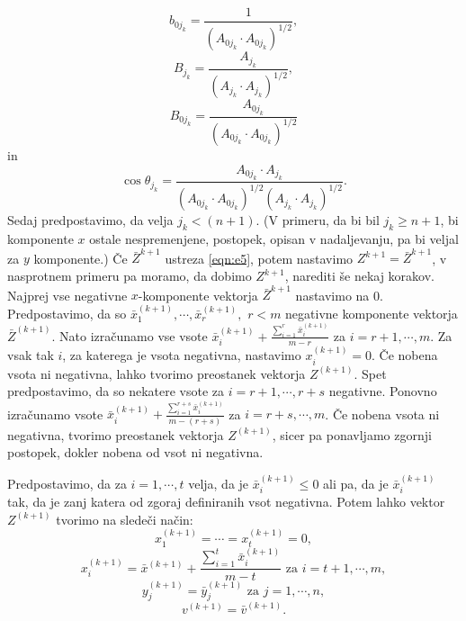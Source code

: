 \documentclass[a4paper,12pt]{article}
\begin{document}
\begin{equation*}
    b_{0j_k} = \frac{1}{(A_{0j_k}\cdot A_{0j_k})^{1/2}},
\end{equation*}
\begin{equation*}
B_{j_k} = \frac{A_{j_k}}{(A_{j_k} \cdot A_{j_k})^{1/2}}, 
\end{equation*}
\begin{equation*}
B_{0j_k} = \frac{A_{0j_k}}{(A_{0j_k}\cdot A_{0j_k})^{1/2}}
\end{equation*}
in 
\begin{equation*}
 \cos{\theta_{j_k}} = \frac{A_{0j_k} \cdot A_{j_k}}{(A_{0j_k}\cdot A_{0j_k})^{1/2}(A_{j_k}\cdot A_{j_k})^{1/2}}.
\end{equation*}
Sedaj predpostavimo, da velja $j_k < (n +1)$. (V primeru, da bi bil $j_k \geq n + 1$, bi komponente $x$ ostale nespremenjene, postopek, opisan v nadaljevanju, pa bi veljal za $y$ komponente.)
Če $\bar{Z}^{k+1}$ ustreza \ref{eqn:e5}, potem nastavimo $Z^{k+1} = \bar{Z}^{k+1}$,
v nasprotnem primeru pa moramo, da dobimo $Z^{k+1}$, narediti še nekaj korakov. Najprej vse negativne $x$-komponente vektorja $\bar{Z}^{k+1}$ nastavimo na 0.
Predpostavimo, da so $\bar{x}_1^{(k+1)}, \cdots, \bar{x}_r^{(k+1)}, \, \, r < m$ negativne komponente vektorja $\bar{Z}^{(k+1)}$. Nato 
izračunamo vse vsote $\bar{x}_i^{(k+1)} + \frac{\sum_{i=1}^r \bar{x}_i^{(k+1)}}{m - r} $ za $i = r +1, \cdots, m$. Za vsak tak $i$, za katerega
je vsota negativna, nastavimo $x_i^{(k+1)} = 0$. Če nobena vsota ni negativna, lahko tvorimo preostanek vektorja $Z^{(k+1)}$. Spet predpostavimo, da so nekatere vsote za $i = r+1, \cdots, r +s$ negativne. Ponovno izračunamo vsote 
$\bar{x}_i^{(k+1)} + \frac{\sum_{i=1}^{r+s} \bar{x}_i^{(k+1)}}{m - (r+s)} $ za $i = r + s, \cdots, m$. Če nobena vsota ni negativna, tvorimo preostanek vektorja $Z^{(k+1)}$, sicer pa ponavljamo zgornji postopek, dokler nobena od vsot ni negativna.\par
Predpostavimo, da za $i = 1, \cdots, t$ velja, da je $\bar{x}_i^{(k+1)} \leq 0$ ali pa, da je $\bar{x}_i^{(k+1)}$ tak, da je zanj katera od zgoraj definiranih vsot negativna. Potem lahko vektor $Z^{(k+1)}$
tvorimo na sledeči način:
\begin{equation*}
    x_1^{(k+1)} = \cdots = x_t^{(k+1)} = 0,
\end{equation*}  
\begin{equation*}
    x_i^{(k+1)} = \bar{x}^{(k+1)} +  \frac{\sum_{i=1}^{t}\bar{x}_i^{(k+1)}}{m-t} \, \, \text{za} \, \, i = t+1, \cdots, m,
\end{equation*}
\begin{equation*}
    y_j^{(k+1)} = \bar{y}_j^{(k+1)} \, \, \text{za} \, \, j = 1, \cdots, n,
\end{equation*}
\begin{equation*}
    v^{(k+1)} = \bar{v}^{(k+1)}.
\end{equation*}
\end{document}
